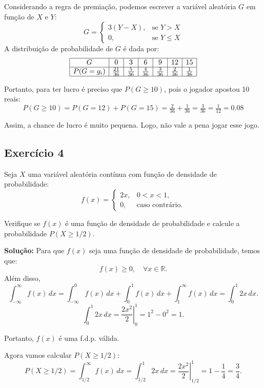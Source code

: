 \documentclass{article}
\begin{document}
Considerando a regra de premiação, podemos escrever a variável aleatória $G$ em função de $X$ e $Y$:
    $$
    G =
    \begin{cases}
    3(Y - X), & \text{se } Y > X \\
    0, & \text{se } Y \leq X
    \end{cases}
    $$
A distribuição de probabilidade de $G$ é dada por:
    $$
    \begin{array}{|c|c|c|c|c|c|c|}
    \hline
    G & 0 & 3 & 6 & 9 & 12 & 15 \\
    \hline
    P(G = g_i) & \tfrac{21}{36} & \tfrac{5}{36} & \tfrac{4}{36} & \tfrac{3}{36} & \tfrac{2}{36} & \tfrac{1}{36} \\
    \hline
    \end{array}
    $$
    
Portanto, para ter lucro é preciso que $P(G \geq 10)$, pois o jogador apostou 10 reais:
    $$
    P(G \geq 10) = P(G = 12) + P(G = 15) 
    = \tfrac{2}{36} + \tfrac{1}{36} 
    = \tfrac{3}{36} 
    = \tfrac{1}{12} 
    = 0.08
    $$

Assim, a chance de lucro é muito pequena. Logo, não vale a pena jogar esse jogo.

\subsection{Exercício 4}
Seja $X$ uma variável aleatória contínua com função de densidade de probabilidade:
    $$
    f(x) =
    \begin{cases}
    2x, & 0 < x < 1, \\
    0, & \text{caso contrário}.
    \end{cases}
    $$

Verifique se $f(x)$ é uma função de densidade de probabilidade e calcule a probabilidade $P(X \geq 1/2)$.

\vspace{0.5cm}
\textbf{Solução:} Para que $f(x)$ seja uma função de densidade de probabilidade, temos que:
    $$
    f(x) \geq 0, \quad \forall x \in \mathbb{R}.
    $$
Além disso,
    $$
    \int_{-\infty}^{\infty} f(x)\, dx 
    = \int_{-\infty}^{0} f(x)\, dx + \int_{0}^{1} f(x)\, dx + \int_{1}^{\infty} f(x)\, dx
    = \int_{0}^{1} 2x \, dx.
    $$
    $$
    \int_{0}^{1} 2x \, dx = \left. \frac{2x^2}{2} \right|_{0}^{1} = 1^2 - 0^2 = 1.
    $$

Portanto, $f(x)$ é uma f.d.p. válida.

Agora vamos calcular $P(X \geq 1/2)$:
    $$
    P(X \geq 1/2) = \int_{1/2}^{\infty} f(x) \, dx = \int_{1/2}^{1} 2x \, dx
    = \left. \frac{2x^2}{2} \right|_{1/2}^{1}
    = 1 - \frac{1}{4} = \frac{3}{4}.
    $$
\end{document}

